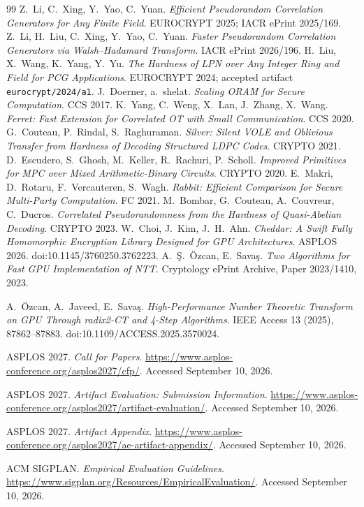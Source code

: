 \documentclass[11pt]{article}
\begin{document}
\begin{thebibliography}{99}
Z.~Li, C.~Xing, Y.~Yao, C.~Yuan.
\emph{Efficient Pseudorandom Correlation Generators for Any Finite Field}.
EUROCRYPT 2025; IACR ePrint 2025/169.
Z.~Li, H.~Liu, C.~Xing, Y.~Yao, C.~Yuan.
\emph{Faster Pseudorandom Correlation Generators via Walsh--Hadamard
Transform}.
IACR ePrint 2026/196.
H.~Liu, X.~Wang, K.~Yang, Y.~Yu.
\emph{The Hardness of LPN over Any Integer Ring and Field for PCG
Applications}.
EUROCRYPT 2024; accepted artifact \texttt{eurocrypt/2024/a1}.
J.~Doerner, a.~shelat. \emph{Scaling ORAM for Secure Computation}.
CCS 2017.
K.~Yang, C.~Weng, X.~Lan, J.~Zhang, X.~Wang.
\emph{Ferret: Fast Extension for Correlated OT with Small Communication}.
CCS 2020.
G.~Couteau, P.~Rindal, S.~Raghuraman.
\emph{Silver: Silent VOLE and Oblivious Transfer from Hardness of Decoding
Structured LDPC Codes}. CRYPTO 2021.
D.~Escudero, S.~Ghosh, M.~Keller, R.~Rachuri, P.~Scholl.
\emph{Improved Primitives for MPC over Mixed Arithmetic-Binary Circuits}.
CRYPTO 2020.
E.~Makri, D.~Rotaru, F.~Vercauteren, S.~Wagh.
\emph{Rabbit: Efficient Comparison for Secure Multi-Party Computation}.
FC 2021.
M.~Bombar, G.~Couteau, A.~Couvreur, C.~Ducros.
\emph{Correlated Pseudorandomness from the Hardness of Quasi-Abelian
Decoding}. CRYPTO 2023.
W.~Choi, J.~Kim, J.~H.~Ahn.
\emph{Cheddar: A Swift Fully Homomorphic Encryption Library Designed for GPU
Architectures}.
ASPLOS 2026. doi:10.1145/3760250.3762223.
A.~\c{S}.~\"Ozcan, E.~Sava\c{s}.
\emph{Two Algorithms for Fast GPU Implementation of NTT}.
Cryptology ePrint Archive, Paper 2023/1410, 2023.
{\raggedright
A.~\"Ozcan, A.~Javeed, E.~Sava\c{s}.
\emph{High-Performance Number Theoretic Transform on GPU Through radix2-CT
and 4-Step Algorithms}.
IEEE Access 13 (2025), 87862--87883.
doi:10.1109/ACCESS.2025.3570024.\par}
{\raggedright
ASPLOS 2027. \emph{Call for Papers}.
\url{https://www.asplos-conference.org/asplos2027/cfp/}.
Accessed September 10, 2026.\par}
{\raggedright
ASPLOS 2027. \emph{Artifact Evaluation: Submission Information}.
\url{https://www.asplos-conference.org/asplos2027/artifact-evaluation/}.
Accessed September 10, 2026.\par}
{\raggedright
ASPLOS 2027. \emph{Artifact Appendix}.
\url{https://www.asplos-conference.org/asplos2027/ae-artifact-appendix/}.
Accessed September 10, 2026.\par}
{\raggedright
ACM SIGPLAN. \emph{Empirical Evaluation Guidelines}.
\url{https://www.sigplan.org/Resources/EmpiricalEvaluation/}.
Accessed September 10, 2026.\par}
\end{thebibliography}
\end{document}
